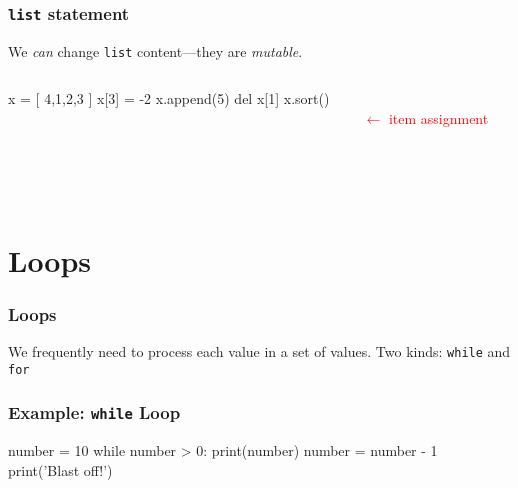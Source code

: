 \documentclass[11pt]{beamer}
\begin{document}
\begin{frame}[fragile]
  \frametitle{\texttt{list} statement}
  \Enlarge

  \begin{itemize}
  \myitem  We \emph{can} change \texttt{list} content---they are \emph{mutable}. %
  \end{itemize}
  \begin{columns}
  \begin{column}{0.6\textwidth}
    \begin{semiverbatim}
    x = [ 4,1,2,3 ]
    x[3] = -2
    x.append(5)
    del x[1]
    x.sort()
    \end{semiverbatim}
  \end{column}
  \begin{column}{0.4\textwidth}
  ~ \\
  \textcolor{red}{$\leftarrow$ item assignment}
  ~ \\ ~ \\ ~ \\ ~ \\
  \end{column}
  \end{columns}
\end{frame}

\section{Loops}

\begin{frame}[fragile]
  \frametitle{Loops}
  \Enlarge

  \begin{itemize}
  \myitem  We frequently need to process each value in a set of values. %
  \myitem  Two kinds:  \texttt{while} and \texttt{for}
  \end{itemize}
\end{frame}

\begin{frame}[fragile]
  \frametitle{Example:  \texttt{while} Loop}
  \Enlarge

  \begin{semiverbatim}
number = 10
while number > 0:
    print(number)
    number = number - 1
print('Blast off!')
  \end{semiverbatim}
\end{frame}
\end{document}
